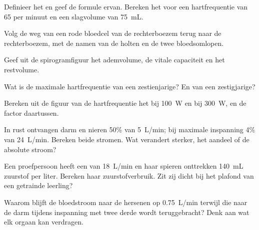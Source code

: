\begin{exercise}[$\star$]\label{exo:g10:heart-lungs-effort:2}
Definieer het  en geef de formule ervan. Bereken het voor
een hartfrequentie van 65 per minuut en een slagvolume van \qty{75}{mL}.
\end{exercise}

\begin{exercise}[$\star$]\label{exo:g10:heart-lungs-effort:3}
Volg de weg van een rode bloedcel van de rechterboezem terug naar de
rechterboezem, met de namen van de holten en de twee bloedsomlopen.
\end{exercise}

\begin{exercise}[$\star$]\label{exo:g10:heart-lungs-effort:4}
Geef uit de spirogramfiguur het ademvolume, de vitale capaciteit en het
restvolume.
\end{exercise}

\begin{exercise}[$\star$]\label{exo:g10:heart-lungs-effort:5}
Wat is de maximale hartfrequentie van een zestienjarige? En van een
zestigjarige?
\end{exercise}

\begin{exercise}[$\star\star$]\label{exo:g10:heart-lungs-effort:6}
Bereken uit de figuur van de hartfrequentie het  bij
\qty{100}{W} en bij \qty{300}{W}, en de factor daartussen.
\end{exercise}

\begin{exercise}[$\star\star$]\label{exo:g10:heart-lungs-effort:7}
In rust ontvangen darm en nieren 50\% van \qty{5}{L/min}; bij maximale
inspanning 4\% van \qty{24}{L/min}. Bereken beide stromen. Wat verandert
sterker, het aandeel of de absolute stroom?
\end{exercise}

\begin{exercise}[$\star\star$]\label{exo:g10:heart-lungs-effort:8}
Een proefpersoon heeft een  van \qty{18}{L/min} en haar
spieren onttrekken \qty{140}{mL} zuurstof per liter. Bereken haar
zuurstofverbruik. Zit zij dicht bij het plafond van een getrainde
leerling?
\end{exercise}

\begin{exercise}[$\star\star$]\label{exo:g10:heart-lungs-effort:9}
Waarom blijft de bloedstroom naar de hersenen op \qty{0.75}{L/min}
terwijl die naar de darm tijdens inspanning met twee derde wordt
teruggebracht? Denk aan wat elk orgaan kan verdragen.
\end{exercise}

